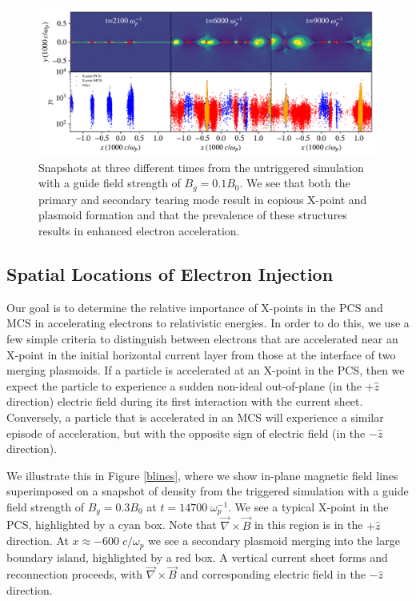 \begin{figure}
	\includegraphics[width=\linewidth]{bguide1_accmec_singleplot.pdf}
	\caption{Snapshots at three different times from the untriggered simulation with a guide field strength of $B_{g}=0.1B_{0}$.  We see that both the primary and secondary tearing mode result in copious X-point and plasmoid formation and that the prevalence of these structures results in enhanced electron acceleration.
			}
	\label{untriggered_bguide1_snapshots}
\end{figure}


\subsection{Spatial Locations of Electron Injection} \label{acc_mec_def}
Our goal is to determine the relative importance of X-points in the PCS and MCS in accelerating electrons to relativistic energies.  In order to do this, we use a few simple criteria to distinguish between electrons that are accelerated near an X-point in the initial horizontal current layer from those at the interface of two merging plasmoids.
If a particle is accelerated at an X-point in the PCS, then we expect the particle to experience a sudden non-ideal out-of-plane (in the $+\hat{z}$ direction) electric field during its first interaction with the current sheet.  Conversely, a particle that is accelerated in an MCS will experience a similar episode of acceleration, but with the opposite sign of electric field (in the $-\hat{z}$ direction).

We illustrate this in Figure \ref{blines}, where we show in-plane magnetic field lines superimposed on a snapshot of density from the triggered simulation with a guide field strength of $B_{g}=0.3B_{0}$ at $t=14700 \; \omega_{p}^{-1}$.  We see a typical X-point in the PCS, highlighted by a cyan box.  Note that $\vec{\nabla} \times \vec{B}$ in this region is in the $+\hat{z}$ direction.  At $x\approx-600 \; c/\omega_{p}$ we see a secondary plasmoid merging into the large boundary island, highlighted by a red box.  A vertical current sheet forms and reconnection proceeds, with $\vec{\nabla} \times \vec{B}$ and corresponding electric field in the $-\hat{z}$ direction.

